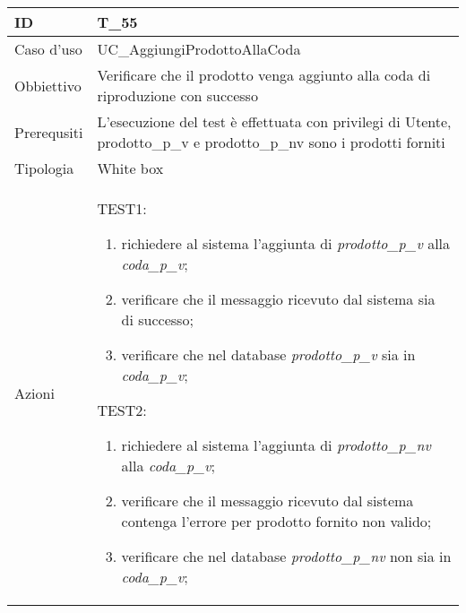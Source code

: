 \begin{table}[hb]
    \centering
    \begin{tabular}{ |p{2cm}|p{10cm}|  }
        \hline
        ID          & T\_55                                                                 \\\hline
        Caso d'uso  & UC\_AggiungiProdottoAllaCoda                                                    \\\hline
        Obbiettivo  & Verificare che il prodotto venga aggiunto alla coda di riproduzione con successo \\\hline
        Prerequsiti & L'esecuzione del test è effettuata con privilegi di Utente, prodotto\_p\_v
        e prodotto\_p\_nv sono i prodotti forniti           \\\hline
        Tipologia   & White box                                                             \\\hline
        Azioni      &
        TEST1:
        \begin{enumerate}[nosep, topsep=0pt]
            \item richiedere al sistema l'aggiunta di \emph{prodotto\_p\_v} alla \emph{coda\_p\_v};
            \item verificare che il messaggio ricevuto dal sistema sia di successo;
            \item verificare che nel database \emph{prodotto\_p\_v} sia in \emph{coda\_p\_v};
        \end{enumerate}
        \vspace{0.5cm} TEST2:
        \begin{enumerate}[nosep, topsep=0pt]
            \item richiedere al sistema l'aggiunta di \emph{prodotto\_p\_nv} alla \emph{coda\_p\_v};
            \item verificare che il messaggio ricevuto dal sistema contenga l'errore per
            prodotto fornito non valido;
            \item verificare che nel database \emph{prodotto\_p\_nv} non sia in \emph{coda\_p\_v};
        \end{enumerate}
        \\\hline
    \end{tabular}
\end{table}

